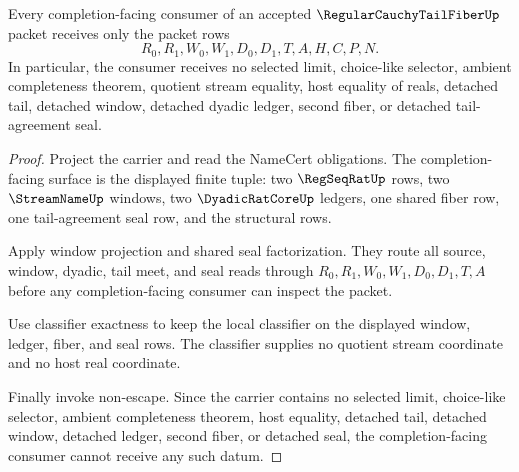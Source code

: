 \begin{theorem}
\label{thm:regular-cauchy-tail-fiber-completion-consumer-nonescape}
Every completion-facing consumer of an accepted $\RegularCauchyTailFiberUp$ packet receives only the packet rows
$$
R_0,R_1,W_0,W_1,D_0,D_1,T,A,H,C,P,N.
$$
In particular, the consumer receives no selected limit, choice-like selector, ambient completeness theorem, quotient stream equality, host equality of reals, detached tail, detached window, detached dyadic ledger, second fiber, or detached tail-agreement seal.
\end{theorem}
\begin{proof}
Project the carrier and read the NameCert obligations. The completion-facing surface is the displayed finite tuple: two $\RegSeqRatUp$ rows, two $\StreamNameUp$ windows, two $\DyadicRatCoreUp$ ledgers, one shared fiber row, one tail-agreement seal row, and the structural rows.

Apply window projection and shared seal factorization. They route all source, window, dyadic, tail meet, and seal reads through $R_0,R_1,W_0,W_1,D_0,D_1,T,A$ before any completion-facing consumer can inspect the packet.

Use classifier exactness to keep the local classifier on the displayed window, ledger, fiber, and seal rows. The classifier supplies no quotient stream coordinate and no host real coordinate.

Finally invoke non-escape. Since the carrier contains no selected limit, choice-like selector, ambient completeness theorem, host equality, detached tail, detached window, detached ledger, second fiber, or detached seal, the completion-facing consumer cannot receive any such datum.
\end{proof}

